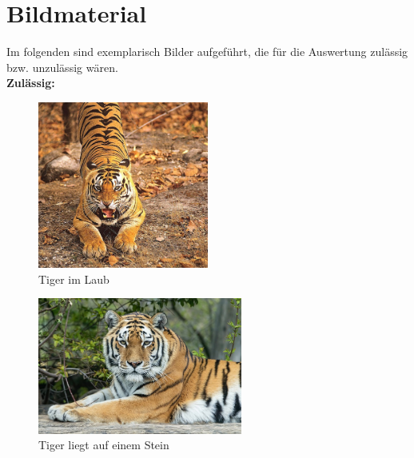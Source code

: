 \newpage


\section{Bildmaterial}

Im folgenden sind exemplarisch Bilder aufgeführt, die für die Auswertung zulässig bzw. unzulässig wären. \\

\textbf{Zulässig:}

\begin{figure}[htbp]
	\centering
		\includegraphics[width=0.50\textwidth]{BilderPDF/zielsetzung/tiger_01.jpg}
	\caption{Tiger im Laub \cite{tiger_laub}}
	\label{fig:tiger_01}
\end{figure}

\vspace{0.5cm}

\begin{figure}[htbp]
	\centering
		\includegraphics[width=0.60\textwidth]{BilderPDF/zielsetzung/tiger_02.jpg}
	\caption{Tiger liegt auf einem Stein \cite{tiger_stein}}
	\label{fig:tiger_02}
\end{figure}

\newpage

